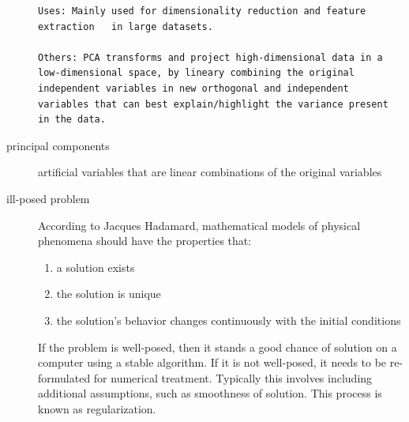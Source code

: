 \documentclass[
]{book}
\providecommand{\tightlist}{%
  \setlength{\itemsep}{0pt}\setlength{\parskip}{0pt}}
\begin{document}
\begin{description}
\begin{verbatim}
Uses: Mainly used for dimensionality reduction and feature extraction   in large datasets.

Others: PCA transforms and project high-dimensional data in a low-dimensional space, by lineary combining the original independent variables in new orthogonal and independent variables that can best explain/highlight the variance present in the data.
\end{verbatim}
\item[principal components]
artificial variables that are linear combinations of the original variables
\item[ill-posed problem]
According to Jacques Hadamard, mathematical models of physical phenomena should have the properties that:

\begin{enumerate}
\def\labelenumi{\arabic{enumi}.}
\tightlist
\item
  a solution exists
\item
  the solution is unique
\item
  the solution's behavior changes continuously with the initial conditions
\end{enumerate}

If the problem is well-posed, then it stands a good chance of solution on a computer using a stable algorithm. If it is not well-posed, it needs to be re-formulated for numerical treatment. Typically this involves including additional assumptions, such as smoothness of solution. This process is known as regularization.


\end{description}
\end{document}
